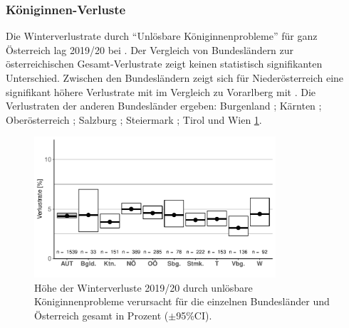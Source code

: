 

\subsubsection{Königinnen-Verluste}
\label{ss:koeniginnen_verluste:U}

Die Winterverlustrate durch \enquote{Unlösbare Königinnenprobleme} für ganz Österreich lag 2019/20 bei . Der Vergleich von Bundesländern zur österreichischen Gesamt-Verlustrate zeigt keinen statistisch signifikanten Unterschied. Zwischen den Bundesländern zeigt sich für Niederösterreich eine signifikant höhere Verlustrate mit  im Vergleich zu Vorarlberg mit .
\newline
Die Verlustraten der anderen Bundesländer ergeben: Burgenland ; Kärnten ; Oberösterreich ; Salzburg ; Steiermark ; Tirol  und Wien  \cref{fig:u:queen:states}.

\begin{figure}[H]
  \centering
  \includegraphics[keepaspectratio,width=0.8\textwidth]{project-U-wintersterblichkeit/figures/plot_queen_states}
  \caption{Höhe der Winterverluste 2019/20 durch unlösbare Königinnenprobleme verursacht für die einzelnen Bundesländer und Österreich gesamt in Prozent ($\pm$95\%CI).}
  \label{fig:u:queen:states}
\end{figure}

\label{ss:koeniginnen_probleme:U}

